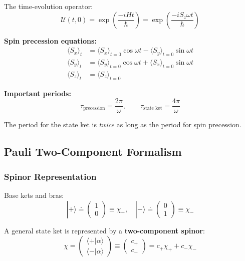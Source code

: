 \documentclass[11pt,a4paper]{article}
\begin{document}
The time-evolution operator:
\begin{equation}
\mathscr{U}(t, 0) = \exp\left(\frac{-iHt}{\hbar}\right) = \exp\left(\frac{-iS_z\omega t}{\hbar}\right)
\tag{3.36}
\end{equation}

\textbf{Spin precession equations:}
\begin{align}
\langle S_x \rangle_t &= \langle S_x \rangle_{t=0}\cos\omega t - \langle S_y \rangle_{t=0}\sin\omega t \tag{3.37a} \\
\langle S_y \rangle_t &= \langle S_y \rangle_{t=0}\cos\omega t + \langle S_x \rangle_{t=0}\sin\omega t \tag{3.37b} \\
\langle S_z \rangle_t &= \langle S_z \rangle_{t=0} \tag{3.37c}
\end{align}

\textbf{Important periods:}
\begin{equation}
\boxed{\tau_{\text{precession}} = \frac{2\pi}{\omega}, \qquad \tau_{\text{state ket}} = \frac{4\pi}{\omega}}
\tag{3.39}
\end{equation}

The period for the state ket is \textit{twice} as long as the period for spin precession.

\subsection{Pauli Two-Component Formalism}

\subsubsection{Spinor Representation}

Base kets and bras:
\begin{equation}
|+\rangle \doteq \begin{pmatrix} 1 \\ 0 \end{pmatrix} \equiv \chi_+, \quad |-\rangle \doteq \begin{pmatrix} 0 \\ 1 \end{pmatrix} \equiv \chi_-
\tag{3.44}
\end{equation}

A general state ket is represented by a \textbf{two-component spinor}:
\begin{equation}
\chi = \begin{pmatrix} \langle+|\alpha\rangle \\ \langle-|\alpha\rangle \end{pmatrix} \equiv \begin{pmatrix} c_+ \\ c_- \end{pmatrix} = c_+\chi_+ + c_-\chi_-
\tag{3.46}
\end{equation}
\end{document}
